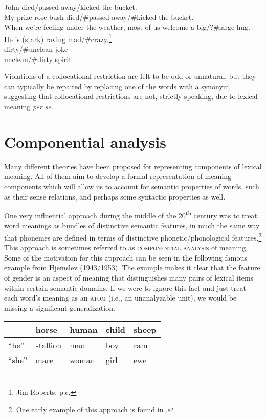 \ea \label{ex:7.15}
\ea John died/passed away/kicked the bucket.\\
\ex My prize rose bush died/\#passed away/\#kicked the bucket.\\
\ex When we’re feeling under the weather, most of us welcome a big/?\#large hug.\\
\ex He is (stark) raving mad/\#crazy.\footnote{Jim Roberts, p.c.}\\
\ex dirty/\#unclean joke\\
\ex unclean/\#dirty spirit
                       \z
\z


Violations of a collocational restriction are felt to be odd or unnatural, but they can typically be repaired by replacing one of the words with a synonym, suggesting that collocational restrictions are not, strictly speaking, due to lexical meaning \textit{per se}.


\section{Componential analysis}\label{sec:} %

Many different theories have been proposed for representing components of lexical meaning. All of them aim to develop a formal representation of meaning components which will allow us to account for semantic properties of words, such as their sense relations, and perhaps some syntactic properties as well.



One very influential approach during the middle of the 20\textsuperscript{th} century was to treat word meanings as bundles of distinctive semantic features, in much the same way that phonemes are defined in terms of distinctive phonetic/phonological features.\footnote{One early example of this approach is found in \citet{Nida1951}.} This approach is sometimes referred to as \textsc{componential analysis} of meaning. Some of the motivation for this approach can be seen in the following famous example from Hjemslev (1943/1953). The example makes it clear that the feature of gender is an aspect of meaning that distinguishes many pairs of lexical items within certain semantic domains. If we were to ignore this fact and just treat each word’s meaning as an \textsc{atom} (i.e., an unanalyzable unit), we would be missing a significant generalization.


\ea
\begin{tabular}[t]{*{5}{l}}
\lsptoprule
 & horse & human & child & sheep\\
\midrule 
“he” & stallion & man & boy & ram\\
“she” & mare & woman & girl & ewe\\
\lspbottomrule
\end{tabular}
\z

